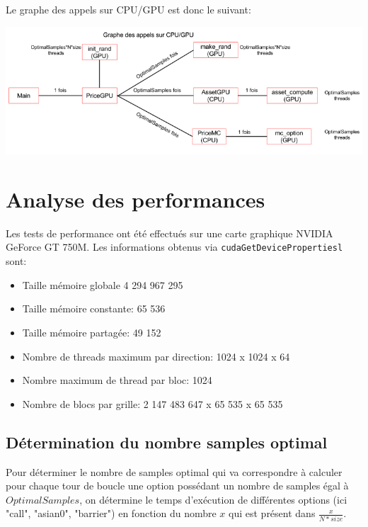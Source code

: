 \documentclass[french,12pt,a4paper]{article}
\begin{document}
Le graphe des appels sur CPU/GPU est donc le suivant:

\begin{center}
\includegraphics[scale=0.5]{appelGPU.png}
\end{center}

\section{Analyse des performances}

Les tests de performance ont été effectués sur une carte graphique NVIDIA GeForce GT 750M. Les informations obtenus via \lstinline!cudaGetDevicePropertiesl! sont:
\begin{itemize}
	\item Taille mémoire globale 4 294 967 295
	\item Taille mémoire constante: 65 536
	\item Taille mémoire partagée: 49 152
	\item Nombre de threads maximum par direction: 1024 x 1024 x 64
	\item Nombre maximum de thread par bloc: 1024
	\item Nombre de blocs par grille: 2 147 483 647 x 65 535 x 65 535
\end{itemize}

\subsection{Détermination du nombre samples optimal}

Pour déterminer le nombre de samples optimal qui va correspondre à calculer pour chaque tour de boucle une option possédant un nombre de samples égal à $OptimalSamples$, on détermine le temps d'exécution de différentes options (ici "call", "asian0", "barrier") en fonction du nombre $x$ qui est présent dans $\frac{x}{N*size}$. \\
\end{document}
